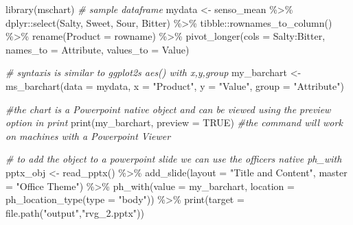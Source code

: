 \documentclass[
]{book}
\newenvironment{Shaded}{\begin{snugshade}}{\end{snugshade}}
\newcommand{\AttributeTok}[1]{\textcolor[rgb]{0.77,0.63,0.00}{#1}}
\newcommand{\CommentTok}[1]{\textcolor[rgb]{0.56,0.35,0.01}{\textit{#1}}}
\newcommand{\ConstantTok}[1]{\textcolor[rgb]{0.00,0.00,0.00}{#1}}
\newcommand{\FunctionTok}[1]{\textcolor[rgb]{0.00,0.00,0.00}{#1}}
\newcommand{\NormalTok}[1]{#1}
\newcommand{\OtherTok}[1]{\textcolor[rgb]{0.56,0.35,0.01}{#1}}
\newcommand{\SpecialCharTok}[1]{\textcolor[rgb]{0.00,0.00,0.00}{#1}}
\newcommand{\StringTok}[1]{\textcolor[rgb]{0.31,0.60,0.02}{#1}}
\begin{document}
\begin{Shaded}
\begin{Highlighting}[]
\FunctionTok{library}\NormalTok{(mschart)}
\CommentTok{\# sample dataframe}
\NormalTok{mydata }\OtherTok{\textless{}{-}}\NormalTok{ senso\_mean }\SpecialCharTok{\%\textgreater{}\%}
\NormalTok{  dplyr}\SpecialCharTok{::}\FunctionTok{select}\NormalTok{(Salty, Sweet, Sour, Bitter) }\SpecialCharTok{\%\textgreater{}\%} 
\NormalTok{  tibble}\SpecialCharTok{::}\FunctionTok{rownames\_to\_column}\NormalTok{() }\SpecialCharTok{\%\textgreater{}\%} 
  \FunctionTok{rename}\NormalTok{(}\AttributeTok{Product =}\NormalTok{ rowname) }\SpecialCharTok{\%\textgreater{}\%}
  \FunctionTok{pivot\_longer}\NormalTok{(}\AttributeTok{cols =}\NormalTok{ Salty}\SpecialCharTok{:}\NormalTok{Bitter, }\AttributeTok{names\_to =} \StringTok{\textquotesingle{}Attribute\textquotesingle{}}\NormalTok{, }\AttributeTok{values\_to =} \StringTok{\textquotesingle{}Value\textquotesingle{}}\NormalTok{)}

\CommentTok{\# syntaxis is similar to ggplot2\textquotesingle{}s aes() with x,y,group}
\NormalTok{my\_barchart }\OtherTok{\textless{}{-}} \FunctionTok{ms\_barchart}\NormalTok{(}\AttributeTok{data =}\NormalTok{ mydata,}
                           \AttributeTok{x =} \StringTok{"Product"}\NormalTok{,}
                           \AttributeTok{y =} \StringTok{"Value"}\NormalTok{,}
                           \AttributeTok{group =} \StringTok{"Attribute"}\NormalTok{)}

\CommentTok{\#the chart is a Powerpoint native object and can be viewed using the preview option in print}
\FunctionTok{print}\NormalTok{(my\_barchart, }\AttributeTok{preview =} \ConstantTok{TRUE}\NormalTok{)}
\CommentTok{\#the command will work on machines with a Powerpoint Viewer}

\CommentTok{\# to add the object to a powerpoint slide we can use the officer\textquotesingle{}s native ph\_with}
\NormalTok{pptx\_obj }\OtherTok{\textless{}{-}} \FunctionTok{read\_pptx}\NormalTok{() }\SpecialCharTok{\%\textgreater{}\%}
  \FunctionTok{add\_slide}\NormalTok{(}\AttributeTok{layout =} \StringTok{"Title and Content"}\NormalTok{, }\AttributeTok{master =} \StringTok{"Office Theme"}\NormalTok{) }\SpecialCharTok{\%\textgreater{}\%}
  \FunctionTok{ph\_with}\NormalTok{(}\AttributeTok{value =}\NormalTok{ my\_barchart, }\AttributeTok{location =} \FunctionTok{ph\_location\_type}\NormalTok{(}\AttributeTok{type =} \StringTok{"body"}\NormalTok{)) }\SpecialCharTok{\%\textgreater{}\%}
  \FunctionTok{print}\NormalTok{(}\AttributeTok{target =} \FunctionTok{file.path}\NormalTok{(}\StringTok{"output"}\NormalTok{,}\StringTok{"rvg\_2.pptx"}\NormalTok{))}
\end{Highlighting}
\end{Shaded}
\end{document}
